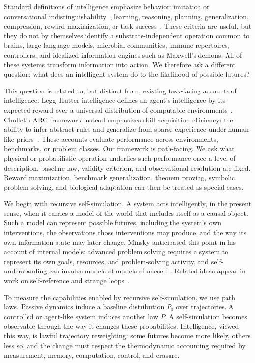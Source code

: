 \documentclass[
  aps,
  prresearch,
  reprint,
  amsmath,
  amssymb,
  superscriptaddress,
  nofootinbib,
  longbibliography
]{revtex4-2}
\begin{document}
Standard definitions of intelligence emphasize behavior: imitation or conversational indistinguishability~\citep{turing1950computing}, learning, reasoning, planning, generalization, compression, reward maximization, or task success~\citep{legg2007universal,russellnorvig2021aima,chollet2019measure}. These criteria are useful, but they do not by themselves identify a substrate-independent operation common to brains, large language models, microbial communities, immune repertoires, controllers, and idealized information engines such as Maxwell's demons. All of these systems transform information into action. We therefore ask a different question: what does an intelligent system do to the likelihood of possible futures?

This question is related to, but distinct from, existing task-facing accounts of  intelligence. Legg--Hutter intelligence defines an agent's intelligence by its expected reward over a universal distribution of computable environments~\citep{legg2007universal}. Chollet's ARC framework instead emphasizes skill-acquisition efficiency: the ability to infer abstract rules and generalize from sparse experience under human-like priors~\citep{chollet2019measure}. These accounts evaluate performance across environments, benchmarks, or problem classes. Our  framework is path-facing. We  ask what physical or probabilistic operation underlies such performance once a level of description, baseline law, validity criterion, and observational resolution are fixed. Reward maximization, benchmark generalization, theorem proving, symbolic problem solving, and biological adaptation can then be treated as special cases.

We begin with recursive self-simulation. A system acts intelligently, in the present sense, when it carries a model of the world that includes itself as a causal object. Such a model can represent possible futures, including the system's own interventions, the observations those interventions may produce, and the way its own information state may later change. Minsky anticipated this point in his account of internal models: advanced problem solving requires a system to represent its own goals, resources, and problem-solving activity, and self-understanding can involve models of models of oneself~\citep{minsky1965matter,minsky1986society,minsky2006emotion}. Related ideas appear in work on self-reference and strange loops~\citep{godel1931undecidable,hofstadter1979geb,hofstadter2007strange}.

To measure the capabilities enabled by recursive self-simulation, we use path laws. Passive dynamics induce a baseline distribution \(P_0\) over trajectories. A controlled or agent-like system induces another law \(P\). A self-simulation becomes observable through the way it changes these probabilities. Intelligence, viewed this way, is lawful trajectory reweighting: some futures become more likely, others less so, and the change must respect the thermodynamic accounting required by measurement, memory, computation, control, and erasure.
\end{document}
